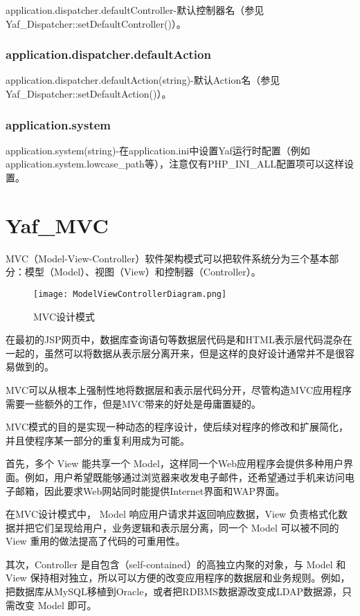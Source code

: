 application.dispatcher.defaultController-默认控制器名（参见Yaf\_Dispatcher::setDefaultController()）。

\subsection{application.dispatcher.defaultAction}

application.dispatcher.defaultAction(string)-默认Action名（参见 Yaf\_Dispatcher::setDefaultAction()）。

\subsection{application.system}

application.system(string)-在application.ini中设置Yaf运行时配置（例如application.system.lowcase\_path等），注意仅有PHP\_INI\_ALL配置项可以这样设置。

\chapter{Yaf\_MVC}

MVC（Model-View-Controller）软件架构模式可以把软件系统分为三个基本部分：模型（Model）、视图（View）和控制器（Controller）。

\begin{figure}[htbp]
\centering
\texttt{[image: ModelViewControllerDiagram.png]}
\caption{MVC设计模式}
\end{figure}

在最初的JSP网页中，数据库查询语句等数据层代码是和HTML表示层代码混杂在一起的，虽然可以将数据从表示层分离开来，但是这样的良好设计通常并不是很容易做到的。

MVC可以从根本上强制性地将数据层和表示层代码分开，尽管构造MVC应用程序需要一些额外的工作，但是MVC带来的好处是毋庸置疑的。

MVC模式的目的是实现一种动态的程序设计，使后续对程序的修改和扩展简化，并且使程序某一部分的重复利用成为可能。

首先，多个 View 能共享一个 Model，这样同一个Web应用程序会提供多种用户界面。例如，用户希望既能够通过浏览器来收发电子邮件，还希望通过手机来访问电子邮箱，因此要求Web网站同时能提供Internet界面和WAP界面。

在MVC设计模式中， Model 响应用户请求并返回响应数据，View 负责格式化数据并把它们呈现给用户，业务逻辑和表示层分离，同一个 Model 可以被不同的 View 重用的做法提高了代码的可重用性。

其次，Controller 是自包含（self-contained）的高独立内聚的对象，与 Model 和 View 保持相对独立，所以可以方便的改变应用程序的数据层和业务规则。例如，把数据库从MySQL移植到Oracle，或者把RDBMS数据源改变成LDAP数据源，只需改变 Model 即可。

